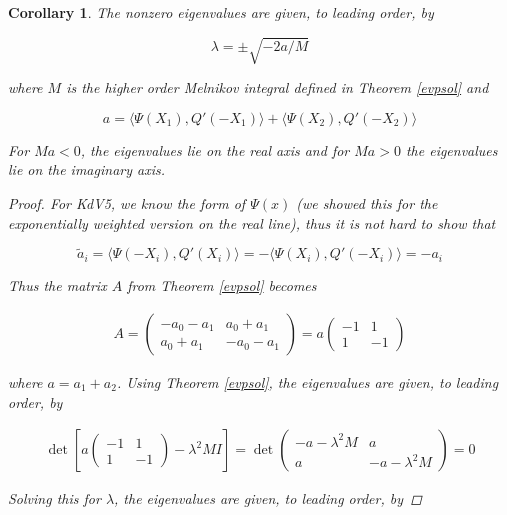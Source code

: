 \documentclass[12pt]{article}
\newtheorem{corollary}{Corollary}
\begin{document}
\begin{corollary}
The nonzero eigenvalues are given, to leading order, by

\begin{equation}
\lambda = \pm \sqrt{-2a/M}
\end{equation}

where $M$ is the higher order Melnikov integral defined in Theorem \ref{evpsol} and 

\begin{equation}
a = \langle \Psi (X_1), Q'(-X_1) \rangle + \langle \Psi (X_2), Q'(-X_2) \rangle 
\end{equation}

For $M a < 0$, the eigenvalues lie on the real axis and for $M a > 0$ the eigenvalues lie on the imaginary axis.

\begin{proof}

For KdV5, we know the form of $\Psi(x)$ (we showed this for the exponentially weighted version on the real line), thus it is not hard to show that

\[
\tilde{a}_i = \langle \Psi(-X_i), Q'(X_i) \rangle = -\langle \Psi(X_i), Q'(-X_i) \rangle = -a_i
\]

Thus the matrix $A$ from Theorem \ref{evpsol} becomes

\begin{align*}
A = 
\begin{pmatrix}
-a_0 - a_1 & a_0 + a_1 \\
a_0 + a_1 & -a_0 - a_1
\end{pmatrix}
= a \begin{pmatrix}
-1 & 1 \\
1 & -1
\end{pmatrix}
\end{align*}

where $a = a_1 + a_2$. Using Theorem \ref{evpsol}, the eigenvalues are given, to leading order, by 

\begin{align*}
\det \left[ a \begin{pmatrix}
-1 & 1 \\
1 & -1
\end{pmatrix}
- \lambda^2 MI \right] = 
\det \begin{pmatrix}
-a - \lambda^2 M & a \\
a & -a - \lambda^2 M
\end{pmatrix}
 = 0
\end{align*}

Solving this for $\lambda$, the eigenvalues are given, to leading order, by


\end{proof}
\end{corollary}
\end{document}
